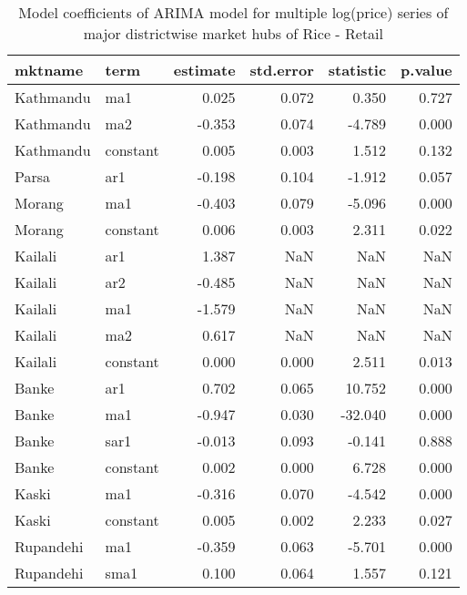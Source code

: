 \documentclass[
  12pt,
]{article}
\begin{document}
\begin{table}

\caption{\label{tab:multiple-arima-summary}Model coefficients of ARIMA model for multiple log(price) series of major districtwise market hubs of Rice - Retail}
\centering
\begin{tabular}[t]{llrrrr}
\toprule
mktname & term & estimate & std.error & statistic & p.value\\
\midrule
Kathmandu & ma1 & 0.025 & 0.072 & 0.350 & 0.727\\
Kathmandu & ma2 & -0.353 & 0.074 & -4.789 & 0.000\\
Kathmandu & constant & 0.005 & 0.003 & 1.512 & 0.132\\
Parsa & ar1 & -0.198 & 0.104 & -1.912 & 0.057\\
Morang & ma1 & -0.403 & 0.079 & -5.096 & 0.000\\
\addlinespace
Morang & constant & 0.006 & 0.003 & 2.311 & 0.022\\
Kailali & ar1 & 1.387 & NaN & NaN & NaN\\
Kailali & ar2 & -0.485 & NaN & NaN & NaN\\
Kailali & ma1 & -1.579 & NaN & NaN & NaN\\
Kailali & ma2 & 0.617 & NaN & NaN & NaN\\
\addlinespace
Kailali & constant & 0.000 & 0.000 & 2.511 & 0.013\\
Banke & ar1 & 0.702 & 0.065 & 10.752 & 0.000\\
Banke & ma1 & -0.947 & 0.030 & -32.040 & 0.000\\
Banke & sar1 & -0.013 & 0.093 & -0.141 & 0.888\\
Banke & constant & 0.002 & 0.000 & 6.728 & 0.000\\
\addlinespace
Kaski & ma1 & -0.316 & 0.070 & -4.542 & 0.000\\
Kaski & constant & 0.005 & 0.002 & 2.233 & 0.027\\
Rupandehi & ma1 & -0.359 & 0.063 & -5.701 & 0.000\\
Rupandehi & sma1 & 0.100 & 0.064 & 1.557 & 0.121\\
\bottomrule
\end{tabular}
\end{table}
\end{document}
